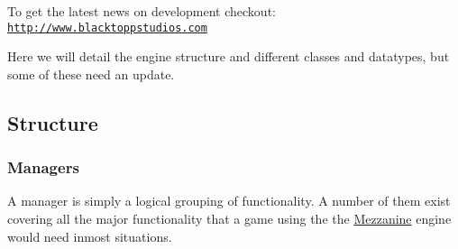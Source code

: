 To get the latest news on development checkout: \href{http://www.blacktoppstudios.com}{\tt http://www.blacktoppstudios.com}

Here we will detail the engine structure and different classes and datatypes, but some of these need an update.\hypertarget{index_Engine}{}\subsection{Structure}\label{index_Engine}
\hypertarget{index_Managers}{}\subsubsection{Managers}\label{index_Managers}
A manager is simply a logical grouping of functionality. A number of them exist covering all the major functionality that a game using the the \hyperlink{namespaceMezzanine}{Mezzanine} engine would need inmost situations.

